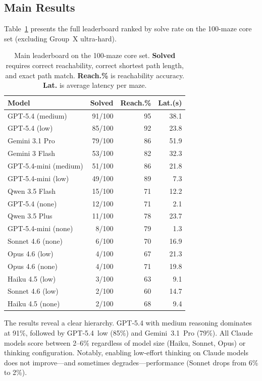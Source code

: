 \documentclass[11pt]{article}
\begin{document}
\subsection{Main Results}

Table~\ref{tab:leaderboard} presents the full leaderboard ranked by solve rate on the 100-maze core set (excluding Group~X ultra-hard).

\begin{table}[t]
\centering
\small
\begin{tabular}{@{}lrrr@{}}
\toprule
\textbf{Model} & \textbf{Solved} & \textbf{Reach.\%} & \textbf{Lat.(s)} \\
\midrule
GPT-5.4 (medium) & 91/100 & 95 & 38.1 \\
GPT-5.4 (low) & 85/100 & 92 & 23.8 \\
Gemini 3.1 Pro & 79/100 & 86 & 51.9 \\
Gemini 3 Flash & 53/100 & 82 & 32.3 \\
GPT-5.4-mini (medium) & 51/100 & 86 & 21.8 \\
GPT-5.4-mini (low) & 49/100 & 89 & 7.3 \\
Qwen 3.5 Flash & 15/100 & 71 & 12.2 \\
GPT-5.4 (none) & 12/100 & 71 & 2.1 \\
Qwen 3.5 Plus & 11/100 & 78 & 23.7 \\
GPT-5.4-mini (none) & 8/100 & 79 & 1.3 \\
Sonnet 4.6 (none) & 6/100 & 70 & 16.9 \\
Opus 4.6 (low) & 4/100 & 67 & 21.3 \\
Opus 4.6 (none) & 4/100 & 71 & 19.8 \\
Haiku 4.5 (low) & 3/100 & 63 & 9.1 \\
Sonnet 4.6 (low) & 2/100 & 60 & 14.7 \\
Haiku 4.5 (none) & 2/100 & 68 & 9.4 \\
\bottomrule
\end{tabular}
\caption{Main leaderboard on the 100-maze core set. \textbf{Solved} requires correct reachability, correct shortest path length, and exact path match. \textbf{Reach.\%} is reachability accuracy. \textbf{Lat.} is average latency per maze.}
\label{tab:leaderboard}
\end{table}

The results reveal a clear hierarchy.
GPT-5.4 with medium reasoning dominates at 91\%, followed by GPT-5.4~low (85\%) and Gemini~3.1~Pro (79\%).
All Claude models score between 2--6\% regardless of model size (Haiku, Sonnet, Opus) or thinking configuration.
Notably, enabling low-effort thinking on Claude models does not improve---and sometimes degrades---performance (Sonnet drops from 6\% to 2\%).
\end{document}
